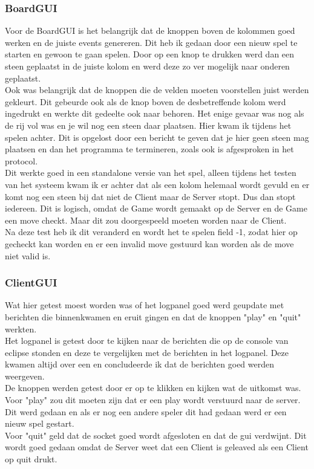 \documentclass[12pt]{article}
\begin{document}
\subsubsection{BoardGUI}
Voor de BoardGUI is het belangrijk dat de knoppen boven de kolommen goed werken en de juiste events genereren. Dit heb ik gedaan door een nieuw spel te starten en gewoon te gaan spelen. Door op een knop te drukken werd dan een steen geplaatst in de juiste kolom en werd deze zo ver mogelijk naar onderen geplaatst.\\
Ook was belangrijk dat de knoppen die de velden moeten voorstellen juist werden gekleurt. Dit gebeurde ook als de knop boven de desbetreffende kolom werd ingedrukt en werkte dit gedeelte ook naar behoren. Het enige gevaar was nog als de rij vol was en je wil nog een steen daar plaatsen. Hier kwam ik tijdens het spelen achter. Dit is opgelost door een bericht te geven dat je hier geen steen mag plaatsen en dan het programma te termineren, zoals ook is afgesproken in het protocol.\\
Dit werkte goed in een standalone versie van het spel, alleen tijdens het testen van het systeem kwam ik er achter dat als een kolom helemaal wordt gevuld en er komt nog een steen bij dat niet de Client maar de Server stopt. Dus dan stopt iedereen. Dit is logisch, omdat de Game wordt gemaakt op de Server en de Game een move checkt. Maar dit zou doorgespeeld moeten worden naar de Client. \\
Na deze test heb ik dit veranderd en wordt het te spelen field -1, zodat hier op gecheckt kan worden en er een invalid move gestuurd kan worden als de move niet valid is.
\subsubsection{ClientGUI}
Wat hier getest moest worden was of het logpanel goed werd geupdate met berichten die binnenkwamen en eruit gingen en dat de knoppen "play" en "quit" werkten.\\
Het logpanel is getest door te kijken naar de berichten die op de console van eclipse stonden en deze te vergelijken met de berichten in het logpanel. Deze kwamen altijd over een en concludeerde ik dat de berichten goed werden weergeven.\\
De knoppen werden getest door er op te klikken en kijken wat de uitkomst was. Voor "play" zou dit moeten zijn dat er een play wordt verstuurd naar de server. Dit werd gedaan en als er nog een andere speler dit had gedaan werd er een nieuw spel gestart.\\
Voor "quit" geld dat de socket goed wordt afgesloten en dat de gui verdwijnt. Dit wordt goed gedaan omdat de Server weet dat een Client is geleaved als een Client op quit drukt.
\end{document}
